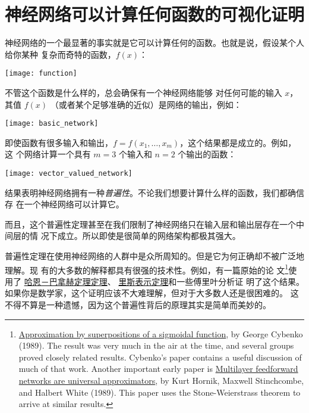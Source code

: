 
\chapter{神经网络可以计算任何函数的可视化证明}
\label{ch:VisualProof}

神经网络的一个最显著的事实就是它可以计算任何的函数。也就是说，假设某个人给你某种
复杂而奇特的函数，$f(x)$：
\begin{center}
  \texttt{[image: function]}
\end{center}

\label{basic_network_precursor}不管这个函数是什么样的，总会确保有一个神经网络能够
对任何可能的输入 $x$，其值 $f(x)$ （或者某个足够准确的近似）是网络的输出，例如：
\begin{center}
  \texttt{[image: basic\_network]}
\end{center}

即使函数有很多输入和输出，$f = f(x_1, \ldots, x_m)$，这个结果都是成立的。例如，这
个网络计算一个具有 $m = 3$ 个输入和 $n = 2$ 个输出的函数：
\begin{center}
  \texttt{[image: vector\_valued\_network]}
\end{center}

结果表明神经网络拥有一种\emph{普遍性}。不论我们想要计算什么样的函数，我们都确信存
在一个神经网络可以计算它。

而且，这个普遍性定理甚至在我们限制了神经网络只在输入层和输出层存在一个中间层的情
况下成立。所以即使是很简单的网络架构都极其强大。

普遍性定理在使用神经网络的人群中是众所周知的。但是它为何正确却不被广泛地理解。现
有的大多数的解释都具有很强的技术性。例如，有一篇原始的论
文\footnote{\href{http://www.dartmouth.edu/~gvc/Cybenko_MCSS.pdf}{Approximation
    by superpositions of a sigmoidal function}, by George Cybenko (1989). The
  result was very much in the air at the time, and several groups proved closely
  related results. Cybenko's paper contains a useful discussion of much of that
  work. Another important early paper is
  \href{http://www.sciencedirect.com/science/article/pii/0893608089900208}{Multilayer
    feedforward networks are universal approximators}, by Kurt Hornik, Maxwell
  Stinchcombe, and Halbert White (1989). This paper uses the Stone-Weierstrass
  theorem to arrive at similar results.}使用了%
\href{https://zh.wikipedia.org/wiki/哈恩－巴拿赫定理}{哈恩－巴拿赫定理定理}、%
\href{https://zh.wikipedia.org/wiki/里斯表示定理}{里斯表示定理}和一些傅里叶分析证
明了这个结果。如果你是数学家，这个证明应该不大难理解，但对于大多数人还是很困难的。
这不得不算是一种遗憾，因为这个普遍性背后的原理其实是简单而美妙的。

